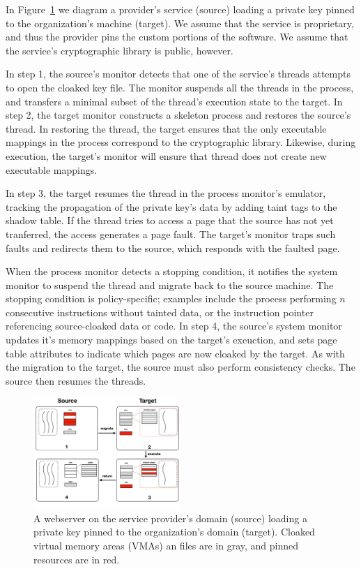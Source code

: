 %
In Figure~\ref{fig:loading-key} we diagram a provider's service (source) loading
a private key pinned to the organization's machine (target).
%
We assume that the service is proprietary, and thus the provider
pins the custom portions of the software.
%
We assume that the service's cryptographic library is public, however.


In step 1, the source's monitor detects that one of the service's threads
attempts to open the cloaked key file.
%
The monitor suspends all the threads in the process, and transfers a minimal
subset of the thread's execution state to the target.
%
In step 2, the target monitor constructs a skeleton process and
restores the source's thread.
%
In restoring the thread, the target ensures that the only executable mappings
in the process correspond to the cryptographic library.
%
Likewise, during execution, the target's monitor will ensure that thread does
not create new executable mappings.


In step 3, the target resumes the thread in the process monitor's emulator,
tracking the propagation of the private key's data by adding taint tags to
the shadow table.
%
If the thread tries to access a page that the source has not yet tranferred,
the access generates a page fault.
%
The target's monitor traps such faults and redirects them to the source, which
responds with the faulted page.


When the process monitor detects a stopping condition, it notifies the
system monitor to suspend the thread and migrate back to the source machine.
%
The stopping condition is policy-specific; examples include the process
performing $n$ consecutive instructions without tainted
data, or the instruction pointer referencing source-cloaked data or code.
%
In step 4, the source's system monitor updates it's memory mappings based on
the target's exeuction, and sets page table attributes to indicate which pages
are now cloaked by the target.
%
As with the migration to the target, the source must also perform consistency
checks.
%
The source then resumes the threads.


\begin{figure}[t]
	\centering
    \includegraphics[width=0.5\textwidth]{figs/loading-key}
    \caption{A webserver on the service provider's domain (source) loading a
    private key pinned to the organization's domain (target).
    Cloaked virtual memory areas (VMAs) an files are in gray, and pinned
    resources are in red.
    }
	\label{fig:loading-key}
\end{figure}


